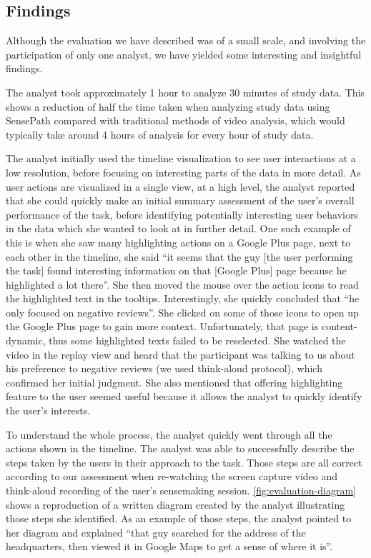\subsection{Findings}
Although the evaluation we have described was of a small scale, and involving the participation of only one analyst, we have yielded some interesting and insightful findings.

The analyst took approximately 1 hour to analyze 30 minutes of study data. This shows a reduction of half the time taken when analyzing study data using SensePath compared with traditional methods of video analysis, which would typically take around 4 hours of analysis for every hour of study data\cite{burr2006vaca}.

The analyst initially used the timeline visualization to see user interactions at a low resolution, before focusing on interesting parts of the data in more detail. As user actions are visualized in a single view, at a high level, the analyst reported that she could quickly make an initial summary assessment of the user's overall performance of the task, before identifying potentially interesting user behaviors in the data which she wanted to look at in further detail. One such example of this is when she saw many highlighting actions on a Google Plus page, next to each other in the timeline, she said ``it seems that the guy [the user performing the task] found interesting information on that [Google Plus] page because he highlighted a lot there''. She then moved the mouse over the action icons to read the highlighted text in the tooltips. Interestingly, she quickly concluded that ``he only focused on negative reviews''. She clicked on some of those icons to open up the Google Plus page to gain more context. Unfortunately, that page is content-dynamic, thus some highlighted texts failed to be reselected. She watched the video in the replay view and heard that the participant was talking to us about his preference to negative reviews (we used think-aloud protocol), which confirmed her initial judgment. She also mentioned that offering highlighting feature to the user seemed useful because it allows the analyst to quickly identify the user's interests.

To understand the whole process, the analyst quickly went through all the actions shown in the timeline. The analyst was able to successfully describe the steps taken by the users in their approach to the task. Those steps are all correct according to our assessment when re-watching the screen capture video and think-aloud recording of the user's sensemaking session. \autoref{fig:evaluation-diagram} shows a reproduction of a written diagram created by the analyst illustrating those steps she identified. As an example of those steps, the analyst pointed to her diagram and explained ``that guy searched for the address of the headquarters, then viewed it in Google Maps to get a sense of where it is''.

